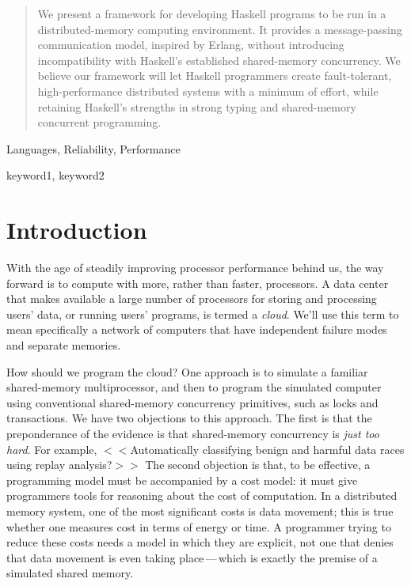 \documentclass[preprint]{sigplanconf}
\begin{document}
\maketitle

\begin{abstract}
We present a framework for developing Haskell programs to be run in a distributed-memory computing environment. It provides a message-passing communication model, inspired by Erlang, without introducing incompatibility with Haskell's established shared-memory concurrency. We believe our framework will let Haskell programmers create fault-tolerant, high-performance distributed systems with a minimum of effort, while retaining Haskell's strengths in strong typing and shared-memory concurrent programming.

\end{abstract}


\terms
Languages, Reliability, Performance

\keywords
keyword1, keyword2

\section{Introduction}

With the age of steadily improving processor performance behind us, the way forward is to compute with more, rather than faster, processors. A data center that makes available a large number of processors for storing and processing users' data, or running users' programs, is termed a \emph{cloud}. We'll use this term to mean specifically a network of computers that have independent failure modes and separate memories.

How should we program the cloud?  One approach is to simulate a familiar shared-memory multiprocessor, and then to program the simulated computer using conventional shared-memory concurrency primitives, such as locks and transactions. 
We have two objections to this approach.  The first is that the preponderance of the evidence is that shared-memory concurrency is \emph{just too hard}.  For example, 
$<<$Automatically classifying benign and harmful data races using replay analysis?$>>$
The second objection is that, to be effective, a programming model must be accompanied by a cost model: it must give programmers tools for reasoning about the cost of computation.  In a distributed memory system, one of the most significant costs is data movement; this is true whether one measures cost in terms of energy or time.  A programmer trying to reduce these costs needs a model in which they are explicit, not one that denies that data movement is even taking place\,---\,which is exactly the premise of a simulated shared memory. 
\end{document}
